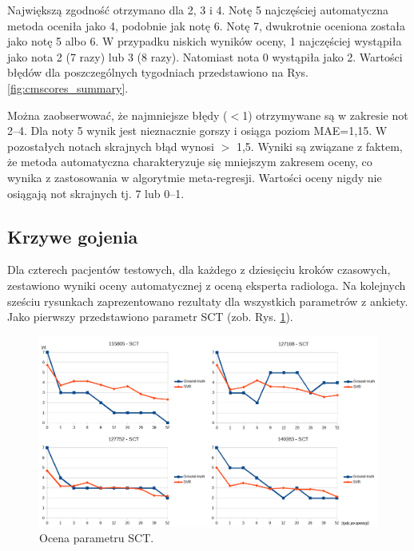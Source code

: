 Największą zgodność otrzymano dla 2, 3 i 4. Notę 5 najczęściej automatyczna metoda oceniła jako 4, podobnie jak notę 6. Notę 7, dwukrotnie oceniona została jako notę 5 albo 6. W przypadku niskich wyników oceny, 1 najczęściej wystąpiła jako nota 2 (7 razy) lub 3 (8 razy). Natomiast nota 0 wystąpiła jako 2. Wartości błędów dla poszczególnych tygodniach przedstawiono na Rys. \ref{fig:cmscores_summary}.

Można zaobserwować, że najmniejsze błędy ($<$1) otrzymywane są w zakresie not 2--4. Dla noty 5 wynik jest nieznacznie gorszy i osiąga poziom MAE=1,15. \linebreak W pozostałych notach skrajnych błąd wynosi $>$ 1,5. Wyniki są związane z faktem, że metoda automatyczna charakteryzuje się mniejszym zakresem oceny, co wynika z zastosowania w algorytmie meta-regresji. Wartości oceny nigdy nie osiągają not skrajnych tj. 7 lub 0--1. 

\subsection{Krzywe gojenia}
 Dla czterech pacjentów testowych, dla każdego z dziesięciu kroków czasowych, zestawiono wyniki oceny automatycznej z oceną eksperta radiologa. Na kolejnych sześciu rysunkach zaprezentowano rezultaty dla wszystkich parametrów z ankiety. Jako pierwszy przedstawiono parametr SCT (zob. Rys. \ref{fig:SCT}).
\begin{figure}[h!]
	\centering
	\includegraphics[width=1\textwidth]{figures/SCT.png}
	\caption{Ocena parametru SCT.}\label{fig:SCT}
\end{figure}


